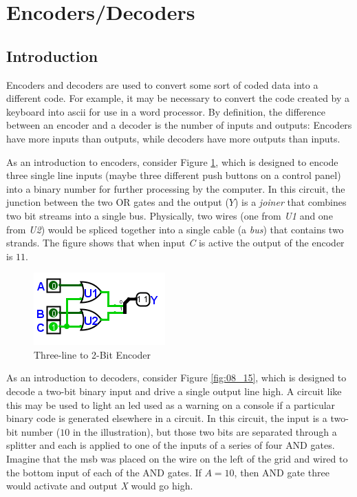 \section{Encoders/Decoders}
\label{CL:sec:encoders_decoders}

\subsection{Introduction}
\label{CL:subsec:introduction_to_encoders_decoders}

Encoders and decoders are used to convert some sort of coded data into a different code. For example, it may be necessary to convert the code created by a keyboard into \gls{ascii} for use in a word processor. By definition, the difference between an encoder and a decoder is the number of inputs and outputs: Encoders have more inputs than outputs, while decoders have more outputs than inputs. 

As an introduction to encoders, consider Figure \ref{fig:08_14}, which is designed to encode three single line inputs (maybe three different push buttons on a control panel) into a binary number for further processing by the computer. In this circuit, the junction between the two \textsf{OR} gates and the output ($ Y $) is a \emph{joiner} that combines two bit streams into a single bus. Physically, two wires (one from \emph{U1} and one from \emph{U2}) would be spliced together into a single cable (a \emph{bus}) that contains two strands. The figure shows that when input \emph{C} is active the output of the encoder is $ 11 $.

\begin{figure}[H]
	\centering
	\includegraphics[width=\maxwidth{.95\linewidth}]{gfx/08_14}
	\caption{Three-line to 2-Bit Encoder}
	\label{fig:08_14}
\end{figure}
 
As an introduction to decoders, consider Figure \ref{fig:08_15}, which is designed to decode a two-bit binary input and drive a single output line high. A circuit like this may be used to light an \gls{led} used as a warning on a console if a particular binary code is generated elsewhere in a circuit. In this circuit, the input is a two-bit number ($ 10 $ in the illustration), but those two bits are separated through a splitter and each is applied to one of the inputs of a series of four \textsf{AND} gates. Imagine that the \gls{msb} was placed on the wire on the left of the grid and wired to the bottom input of each of the \textsf{AND} gates. If $ A=10 $, then \textsf{AND} gate three would activate and output \emph{X} would go high.

